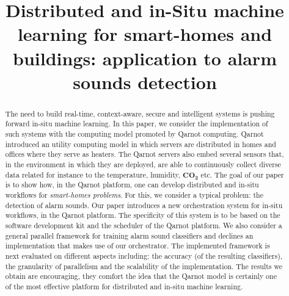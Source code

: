 \documentclass[10pt, conference, compsocconf]{IEEEtran}
\begin{document}
%
\title{Distributed and in-Situ machine learning for smart-homes and buildings: application to alarm sounds detection}



\author{
\and
{}
\and
{}
}

\maketitle

\setlength{\belowcaptionskip}{0pt}
\setlength{\intextsep}{1pt}
\setlength{\dbltextfloatsep}{3pt}
\setlength{\textfloatsep}{3pt}


\begin{abstract}
The need to build real-time, context-aware, secure and intelligent systems is pushing forward in-situ machine learning. 
In this paper, we consider the implementation of such systems with the computing model promoted by 
Qarnot computing. Qarnot introduced an utility computing model in which servers are distributed in homes and offices where they
serve as heaters. The Qarnot servers also embed several sensors that, in the environment in which they are deployed, are able to continuously 
collect diverse data related for instance to the temperature, humidity, $\mathbf{CO_2}$ etc. The goal of our paper is to show how, 
in the Qarnot platform, one can develop distributed and in-situ workflows for {\it smart-homes problems}. For this, 
we consider a typical problem: the detection of alarm sounds. Our paper introduces a new orchestration system for in-situ workflows, 
in the Qarnot platform. 
The specificity of this system is to be based on the software development kit and the scheduler of the Qarnot platform.
We also consider a general parallel framework for training alarm sound classifiers and declines an implementation that makes 
use of our orchestrator.
The implemented framework is next evaluated on different aspects including: the accuracy (of the resulting classifiers), the granularity of parallelism and the scalability of the implementation. The results we obtain are encouraging, they comfort the idea that the Qarnot model is certainly one of the most effective platform for distributed and in-situ machine learning. 
\end{abstract}
\end{document}
